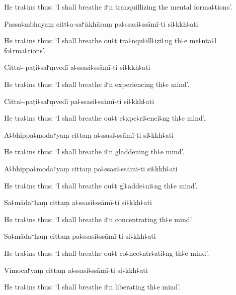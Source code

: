 \begin{english}
  He tra꜕ins thus: `I shall breathe i꜓n tranquillizing the mental forma꜕tions'.
\end{english}

Passa꜕mbhayaṃ citt꜕a-sa꜓ṅkhāraṃ pa꜕ssasi꜕ssāmī-ti si꜕kkh꜕ati

\begin{english}
  He tra꜕ins thus: `I shall breathe ou꜕t tra꜕nqu꜕ill꜕izi꜕ng th꜕e me꜕nta꜕l fo꜕rma꜕tions'.
\end{english}

Citta꜕-paṭi꜕sa꜓ṃvedī a꜕ssasi꜕ssāmī-ti si꜕kkh꜕ati

\begin{english}
  He tra꜕ins thus: `I shall breathe i꜓n experiencing th꜕e mind'.
\end{english}

Citta꜕-paṭi꜕sa꜓ṃvedī pa꜕ssasi꜕ssāmī-ti si꜕kkh꜕ati

\begin{english}
  He tra꜕ins thus: `I shall breathe ou꜕t e꜕xpe꜕ri꜕enci꜕ng th꜕e mind'.
\end{english}

A꜕bhippa꜕moda꜓yaṃ cittaṃ a꜕ssasi꜕ssāmī-ti si꜕kkh꜕ati

\begin{english}
  He tra꜕ins thus: `I shall breathe i꜓n gladdening th꜕e mind'.
\end{english}

A꜕bhippa꜕moda꜓yaṃ cittaṃ pa꜕ssasi꜕ssāmī-ti si꜕kkh꜕ati

\begin{english}
  He tra꜕ins thus: `I shall breathe ou꜕t gl꜕adde꜕ni꜕ng th꜕e mind'.
\end{english}

Sa꜕māda꜓haṃ cittaṃ a꜕ssasi꜕ssāmī-ti si꜕kkh꜕ati

\begin{english}
  He tra꜕ins thus: `I shall breathe i꜓n concentrating th꜕e mind'
\end{english}

Sa꜕māda꜓haṃ cittaṃ pa꜕ssasi꜕ssāmī-ti si꜕kkh꜕ati

\begin{english}
  He tra꜕ins thus: `I shall breathe ou꜕t co꜕nce꜕ntr꜕ati꜕ng th꜕e mind'.
\end{english}

Vimoca꜓yaṃ cittaṃ a꜕ssasi꜕ssāmī-ti si꜕kkh꜕ati

\begin{english}
  He tra꜕ins thus: `I shall breathe i꜓n liberating th꜕e mind'.
\end{english}

